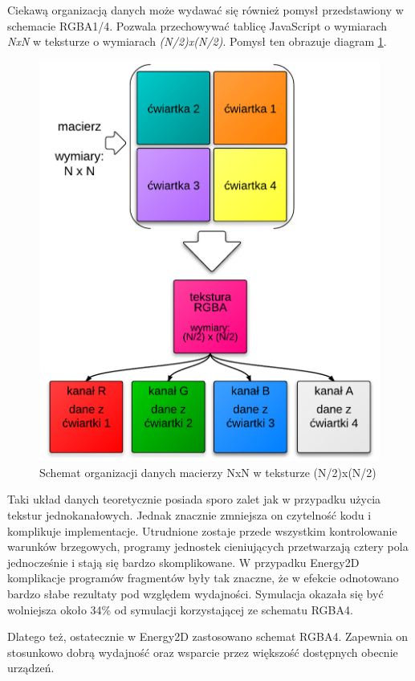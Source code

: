 Ciekawą organizacją danych może wydawać się również pomysł przedstawiony w
schemacie RGBA1/4. Pozwala przechowywać tablicę JavaScript o wymiarach
\emph{\mbox{NxN}} w teksturze o wymiarach \emph{\mbox{(N/2)x(N/2)}}. Pomysł
ten obrazuje diagram \ref{fig:rgba14Tex}.

\begin{figure}[hbp]
\centering
\includegraphics[width=.9\textwidth]{img/rgba14Tex}
\caption{Schemat organizacji danych macierzy NxN w teksturze (N/2)x(N/2)}
\label{fig:rgba14Tex}
\end{figure}

Taki układ danych teoretycznie posiada sporo zalet jak w przypadku użycia
tekstur jednokanałowych. Jednak znacznie zmniejsza on czytelność kodu i
komplikuje implementacje. Utrudnione zostaje przede wszystkim kontrolowanie
warunków brzegowych, programy jednostek cieniujących przetwarzają cztery pola
jednocześnie i stają się bardzo skomplikowane. W przypadku Energy2D komplikacje
programów fragmentów były tak znaczne, że w efekcie odnotowano bardzo słabe
rezultaty pod względem wydajności. Symulacja okazała się być wolniejsza około
34\% od symulacji korzystającej ze schematu RGBA4.

Dlatego też, ostatecznie w Energy2D zastosowano schemat RGBA4. Zapewnia on
stosunkowo dobrą wydajność oraz wsparcie przez większość dostępnych obecnie
urządzeń.